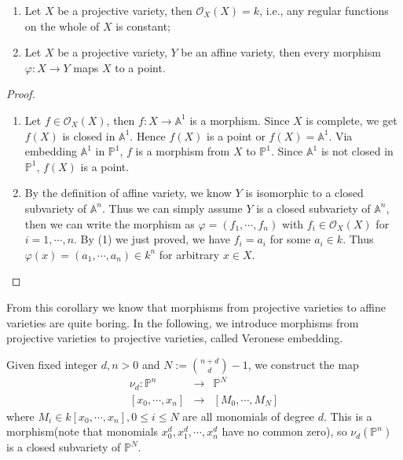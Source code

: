 \begin{corollary}
	\noindent\begin{enumerate}
		\item Let $ X $ be a projective variety, then $ \mathcal{O}_X(X)=k $, i.e., any regular functions on the whole of $ X $ is constant;
		\item Let $ X $ be a projective variety, $ Y $ be an affine variety, then every morphism $ \varphi:X\to Y $ maps $ X $ to a point.
	\end{enumerate}
\end{corollary}
\begin{proof}
	\noindent\begin{enumerate}
		\item Let $ f\in\mathcal{O}_X(X) $, then $ f:X\to \mathbb{A}^1 $ is a morphism. Since $ X $ is complete, we get $ f(X) $ is closed in $ \mathbb{A}^1 $. Hence $ f(X) $ is a point or $ f(X)=\mathbb{A}^1 $. Via embedding $ \mathbb{A}^1 $ in $ \mathbb{P}^1 $, $ f $ is a morphism from $ X $ to $ \mathbb{P}^1 $. Since $ \mathbb{A}^1 $ is not closed in $ \mathbb{P}^1 $, $ f(X) $ is a point.
		\item By the definition of affine variety, we know $ Y $ is isomorphic to a closed subvariety of $ \mathbb{A}^n $. Thus we can simply assume $ Y $ is a closed subvariety of $ \mathbb{A}^n $, then we can write the morphism as $ \varphi=(f_1,\cdots,f_n) $ with $ f_i\in \mathcal{O}_X(X) $ for $ i=1,\cdots,n $. By (1) we just proved, we have $ f_i =a_i$ for some $ a_i\in k $. Thus $ \varphi(x)=(a_1,\cdots,a_n)\in k^n $ for arbitrary $ x\in X $.
	\end{enumerate}
\end{proof}
\begin{remark}
	From this corollary we know that morphisms from projective varieties to affine varieties are quite boring. In the following, we introduce morphisms from projective varieties to projective varieties, called Veronese embedding.
\end{remark}
\begin{definition}
	Given fixed integer $ d,n>0 $ and $ N:=\binom{n+d}{d}-1 $, we construct the map
	\begin{equation}
		\begin{array}{ccc}
			\nu_d:\mathbb{P}^n & \to & \mathbb{P}^N       \\
			{}[x_0,\cdots,x_n] & \to & [ M_0,\cdots,M_N ]
		\end{array}
	\end{equation}
	where $ M_i\in k[x_0,\cdots,x_n], 0\leq i\leq N $ are all monomials of degree $ d $.
	This is a morphism(note that monomials $ x_0^d,x_1^d,\cdots,x_n^d $ have no common zero), so $ \nu_d(\mathbb{P}^n) $ is a closed subvariety of $ \mathbb{P}^N $.
\end{definition}
